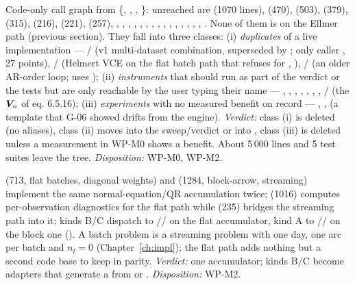  Code-only call graph from \{, , , \}: unreached are  (1070 lines),  (470),  (503),  (379),  (315),  (216),  (221),  (257), , , , , , , , , , , , , , , , . None of them is on the Ellmer path (previous section). They fall into three classes: (i) \emph{duplicates} of a live implementation --- / (v1 multi-dataset combination, superseded by ; only caller , 27 points), / (Helmert VCE on the flat batch path that  refuses for , ), / (an older AR-order loop;  uses ); (ii) \emph{instruments} that should run as part of the verdict or the tests but are only reachable by the user typing their name --- , , , , , , , / (the $\bm{V}_n$ of eq. 6.5.16); (iii) \emph{experiments} with no measured benefit on record --- , ,  (a template that G-06 showed drifts from the engine). \textit{Verdict:} class (i) is deleted (no aliases), class (ii) moves into the sweep/verdict or into , class (iii) is deleted unless a measurement in WP-M0 shows a benefit. About 5\,000 lines and 5 test suites leave the tree. \textit{Disposition:} WP-M0, WP-M2.

  (713, flat batches, diagonal weights) and  (1284, block-arrow, streaming) implement the same normal-equation/QR accumulation twice;  (1016) computes per-observation diagnostics for the flat path while  (235) bridges the streaming path into it;  kinds B/C dispatch to // on the flat accumulator, kind A to // on the block one (). A batch problem is a streaming problem with one day, one arc per batch and $n_l=0$ (Chapter~\ref{ch:impl}); the flat path adds nothing but a second code base to keep in parity. \textit{Verdict:} one accumulator; kinds B/C become adapters that generate a  from  or . \textit{Disposition:} WP-M2.

